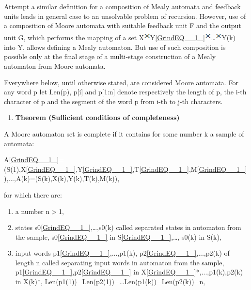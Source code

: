 \documentclass{article}
\begin{document}
Attempt a similar definition for a composition of Mealy automata and feedback units leads in general case to an unsolvable problem of recursion. However, use of a composition of Moore automata with suitable feedback unit F and the output unit G, which performs the mapping of a set X\includegraphics[bb=0mm 0mm 208mm 296mm, width=3.3mm, height=5.4mm, viewport=3mm 4mm 205mm 292mm]{image4}Y\eqref{GrindEQ__1_}\includegraphics[bb=0mm 0mm 208mm 296mm, width=3.3mm, height=5.4mm, viewport=3mm 4mm 205mm 292mm]{image6}\dots \includegraphics[bb=0mm 0mm 208mm 296mm, width=3.3mm, height=5.4mm, viewport=3mm 4mm 205mm 292mm]{image8}Y(k) into Y, allows defining a Mealy automaton. But use of such composition is possible only at the final stage of a multi-stage construction of a Mealy automaton from Moore automata.

Everywhere below, until otherwise stated, are considered Moore automata. For any word p let Len(p), p[i] and p[1:n] denote respectively the length of p, the i-th character of p and the segment of the word p from i-th to j-th characters.

\begin{enumerate}
\item  \textbf{Theorem (Sufficient conditions of completeness)}
\end{enumerate}

A Moore automaton set is complete if it contains for some number k a sample of automata:

A\eqref{GrindEQ__1_}=(S(1),X\eqref{GrindEQ__1_},Y\eqref{GrindEQ__1_},T\eqref{GrindEQ__1_},M\eqref{GrindEQ__1_}),...,A(k)=(S(k),X(k),Y(k),T(k),M(k)),

for which there are:

\begin{enumerate}
\item  a number n$>$1,

\item  states s0\eqref{GrindEQ__1_},\dots ,s0(k) called separated states in automaton from the sample, s0\eqref{GrindEQ__1_} in S\eqref{GrindEQ__1_},\dots , s0(k) in S(k),

\item  input words p1\eqref{GrindEQ__1_},...,p1(k), p2\eqref{GrindEQ__1_},...,p2(k) of length n called separating input words in automaton from the sample, p1\eqref{GrindEQ__1_},p2\eqref{GrindEQ__1_} in X\eqref{GrindEQ__1_}*,...,p1(k),p2(k) in X(k)*, Len(p1(1))=Len(p2(1))=\dots  Len(p1(k))=Len(p2(k))=n,
\end{enumerate}
\end{document}
